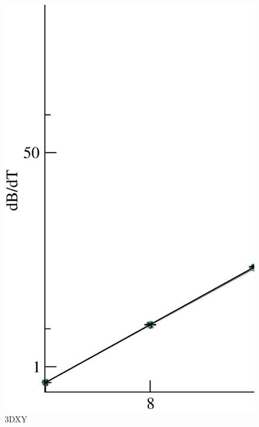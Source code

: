 \begin{figure}[!htpb]
  \centering
  \includegraphics[width=15cm]{./plots/3DXY/3DXY_dBdT_vs_L.eps}
  \caption{3DXY}
\end{figure}

